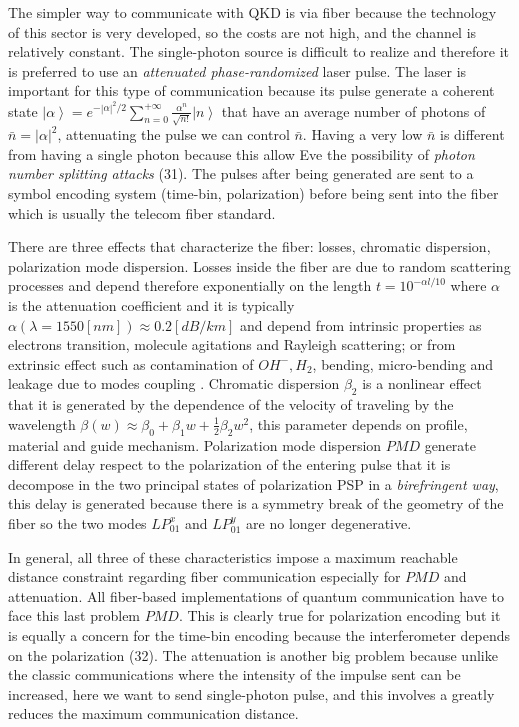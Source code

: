 
The simpler way to communicate with QKD is via fiber because the technology of this sector is very developed, so the costs are not high, and the channel is relatively constant. The single-photon source is difficult to realize and therefore it is preferred to use an \textit{attenuated phase-randomized} laser pulse. The laser is important for this type of communication because its pulse generate a coherent state $\left|\alpha\right> = e^{- |\alpha|^2 / 2} \sum_{n=0}^{+\infty} \frac{\alpha^n}{\sqrt{n!}} \left|n\right>$ that have an average number of photons of $\bar{n} = |\alpha|^2$, attenuating the pulse we can control $\bar{n}$. Having a very low $\bar{n}$ is different from having a single photon because this allow Eve the possibility of \textit{photon number splitting attacks} (31). The pulses after being generated are sent to a symbol encoding system (time-bin, polarization) before being sent into the fiber which is usually the telecom fiber standard.

There are three effects that characterize the fiber: losses, chromatic dispersion, polarization mode dispersion. Losses inside the fiber are due to random scattering processes and depend therefore exponentially on the length $t = 10^{-\alpha l / 10}$ where $\alpha$ is the attenuation coefficient and it is typically $\alpha(\lambda = 1550[nm]) \approx 0.2 [dB / km]$ and depend from intrinsic properties as electrons transition, molecule agitations and Rayleigh scattering; or from extrinsic effect such as contamination of $OH^-, H_2$, bending, micro-bending and leakage due to modes coupling . Chromatic dispersion $\beta_2$ is a nonlinear effect that it is generated by the dependence of the velocity of traveling by the wavelength $\beta(w) \approx \beta_0 + \beta_1 w + \frac{1}{2} \beta_2 w^2$, this parameter depends on profile, material and guide mechanism. Polarization mode dispersion $PMD$ generate different delay respect to the polarization of the entering pulse that it is decompose in the two principal states of polarization PSP in a \textit{birefringent way}, this delay is generated because there is a symmetry break of the geometry of the fiber so the two modes $LP_{01}^x$ and $LP_{01}^y$ are no longer degenerative.

In general, all three of these characteristics impose a maximum reachable distance constraint regarding fiber communication especially for $PMD$ and attenuation. All fiber-based implementations of quantum communication have to face this last problem $PMD $. This is clearly true for polarization encoding but it is equally a concern for the time-bin encoding because the interferometer depends on the polarization (32). The attenuation is another big problem because unlike the classic communications where the intensity of the impulse sent can be increased, here we want to send single-photon pulse, and this involves a greatly reduces the maximum communication distance.

